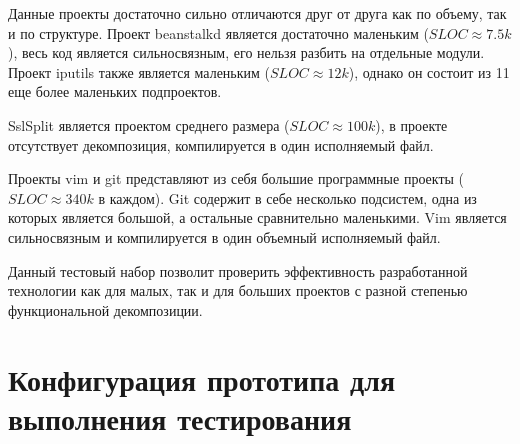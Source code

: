 Данные проекты достаточно сильно отличаются друг от друга как по объему, так и по структуре. Проект beanstalkd является достаточно маленьким ($SLOC \approx 7.5k$), весь код является сильносвязным, его нельзя разбить на отдельные модули. Проект iputils также является маленьким ($SLOC \approx 12k$), однако он состоит из 11 еще более маленьких подпроектов.

SslSplit является проектом среднего размера ($SLOC \approx 100k$), в проекте отсутствует декомпозиция, компилируется в один исполняемый файл.

Проекты vim и git представляют из себя большие программные проекты ($SLOC \approx 340k$ в каждом). Git содержит в себе несколько подсистем, одна из которых является большой, а остальные сравнительно маленькими. Vim является сильносвязным и компилируется в один объемный исполняемый файл.

Данный тестовый набор позволит проверить эффективность разработанной технологии как для малых, так и для больших проектов с разной степенью функциональной декомпозиции.

\section{Конфигурация прототипа для выполнения тестирования}
